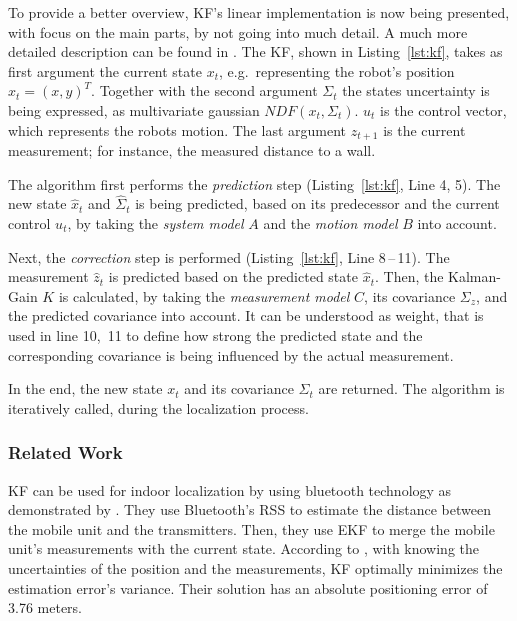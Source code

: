 
To provide a better overview, \ac{KF}'s linear implementation is now being presented, with focus on the main parts, by not going into much detail. A much more detailed description can be found in \citet{thrun:prob_robo}. 
The \ac{KF}, shown in Listing~\ref{lst:kf}, takes as first argument the current state $x_t$, e.g.\ representing the robot's position $x_t = (x, y)^T$. Together with the second argument $\Sigma_t$ the states uncertainty is being expressed, as multivariate gaussian $NDF(x_t, \Sigma_t)$. $u_t$ is the control vector, which represents the robots motion. The last argument $z_{t+1}$ is the current measurement; for instance, the measured distance to a wall.

The algorithm first performs the \emph{prediction} step (Listing~\ref{lst:kf}, Line 4, 5). The new state $\hat{x}_t$ and $\hat{\Sigma}_t$ is being predicted, based on its predecessor and the current control $u_t$, by taking the \emph{system model} $A$ and the \emph{motion model} $B$ into account.

Next, the \emph{correction} step is performed (Listing~\ref{lst:kf}, Line 8\,--\,11). The measurement $\hat{z}_t$ is predicted based on the predicted state $\hat{x}_t$. Then, the Kalman-Gain $K$ is calculated, by taking the \emph{measurement model} $C$, its covariance $\Sigma_z$, and the predicted covariance into account. It can be understood as weight, that is used in line 10,~11 to define how strong the predicted  state and the corresponding covariance is being influenced by the actual measurement.

In the end, the new state $x_t$ and its covariance $\Sigma_t$ are returned. The algorithm is iteratively called, during the localization process.

\subsubsection*{Related Work}
\ac{KF} can be used for indoor localization by using bluetooth technology as demonstrated by \citet{kotanen:exp_local_pos_bt}. They use Bluetooth's \ac{RSS} to estimate the distance between the mobile unit and the transmitters. Then, they use \acl{EKF} to merge the mobile unit's measurements with the current state. According to \cite{kotanen:exp_local_pos_bt}, with knowing the uncertainties of the position and the measurements, \ac{KF} optimally minimizes the estimation error's variance. Their solution has an absolute positioning error of 3.76 meters.

